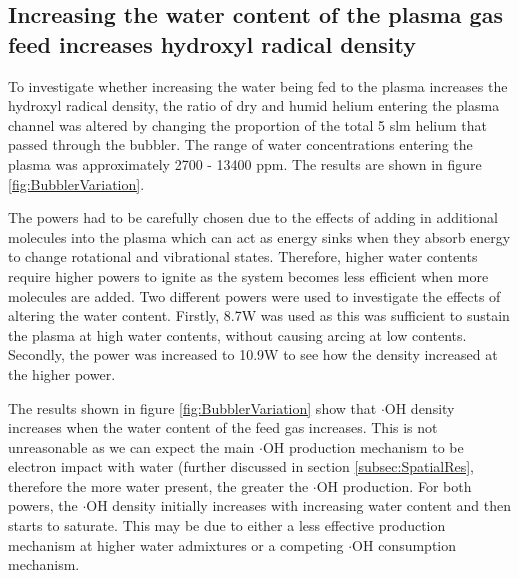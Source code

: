 \documentclass[11pt, oneside]{article}   	%
\begin{document}
\subsection{Increasing the water content of the plasma gas feed increases hydroxyl radical density}

To investigate whether increasing the water being fed to the plasma increases the hydroxyl radical density, the ratio of dry and humid helium entering the plasma channel was altered by changing the proportion of the total 5 slm helium that passed through the bubbler. The range of water concentrations entering the plasma was approximately 2700 - 13400 ppm. The results are shown in figure \ref{fig:BubblerVariation}.

The powers had to be carefully chosen due to the effects of adding in additional molecules into the plasma which can act as energy sinks when they absorb energy to change rotational and vibrational states. 
Therefore, higher water contents require higher powers to ignite as the system becomes less efficient when more molecules are added.
Two different powers were used to investigate the effects of altering the water content. Firstly, 8.7W was used as this was sufficient to sustain the plasma at high water contents, without causing arcing at low contents. Secondly, the power was increased to 10.9W to see how the density increased at the higher power. 

The results shown in figure \ref{fig:BubblerVariation} show that $\cdot$OH density increases when the water content of the feed gas increases. This is not unreasonable as we can expect the main $\cdot$OH production mechanism to be electron impact with water (further discussed in section \ref{subsec:SpatialRes}, therefore the more water present, the greater the $\cdot$OH production.
For both powers, the $\cdot$OH density initially increases with increasing water content and then starts to saturate.
This may be due to either a less effective production mechanism at higher water admixtures or a competing $\cdot$OH consumption mechanism.

\end{document}
